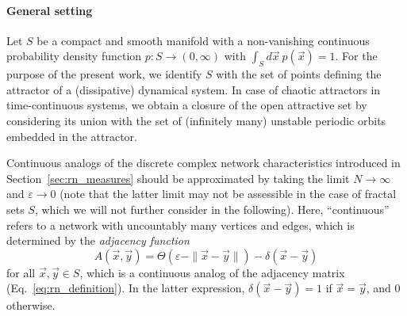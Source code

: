 		\paragraph{General setting}
		Let $S$ be a compact and smooth manifold with a non-vanishing continuous probability density function $p:S\to(0,\infty)$ with $\int_S d\vec{x}\ p(\vec{x}) = 1$. For the purpose of the present work, we identify $S$ with the set of points defining the attractor of a (dissipative) dynamical system. In case of chaotic attractors in time-continuous systems, we obtain a closure of the open attractive set by considering its union with the set of (infinitely many) unstable periodic orbits embedded in the attractor.

		Continuous analogs of the discrete complex network characteristics introduced in Section~\ref{sec:rn_measures} should be approximated by taking the limit $N\to\infty$ and $\varepsilon\to 0$ (note that the latter limit may not be assessible in the case of fractal sets $S$, which we will not further consider in the following). Here, ``continuous'' refers to a network with uncountably many vertices and edges, which is determined by the \emph{adjacency function}
\begin{equation}
A(\vec{x},\vec{y})=\Theta(\varepsilon-\|\vec{x}-\vec{y}\|)-\delta(\vec{x}-\vec{y})
\end{equation}
\noindent
for all $\vec{x},\vec{y}\in S$, which is a continuous analog of the adjacency matrix (Eq.~\ref{eq:rn_definition}). In the latter expression, $\delta(\vec{x}-\vec{y})=1$ if $\vec{x}=\vec{y}$, and $0$ otherwise.

